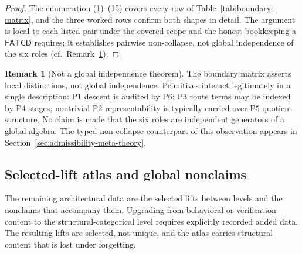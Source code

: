 \documentclass[11pt]{article}
\theoremstyle{definition}
\newtheorem{remark}[theorem]{Remark}
\newcommand{\FATCD}{\ensuremath{\mathsf{FATCD}}}
\newcommand{\Pone}{\ensuremath{\mathrm{P1}}}
\newcommand{\Ptwo}{\ensuremath{\mathrm{P2}}}
\newcommand{\Pthree}{\ensuremath{\mathrm{P3}}}
\newcommand{\Pfour}{\ensuremath{\mathrm{P4}}}
\newcommand{\Pfive}{\ensuremath{\mathrm{P5}}}
\newcommand{\Psix}{\ensuremath{\mathrm{P6}}}
\begin{document}
\begin{proof}
The enumeration (1)--(15) covers every row of
Table~\ref{tab:boundary-matrix}, and the three worked rows confirm both shapes
in detail. The argument is local to each listed pair under the covered scope and
the honest bookkeeping a \FATCD{} requires; it establishes pairwise
non-collapse, not global independence of the six roles (cf.\
Remark~\ref{rem:not-global-independence}).
\end{proof}

\begin{remark}[Not a global independence theorem]\label{rem:not-global-independence}
The boundary matrix asserts local distinctions, not global
independence. Primitives interact legitimately in a single
description: \Pone{} descent is audited by \Psix{}; \Pthree{} route
terms may be indexed by \Pfour{} stages; nontrivial \Ptwo{}
representability is typically carried over \Pfive{} quotient structure.
No claim is made that the six roles are independent generators of a
global algebra. The typed-non-collapse counterpart of this observation
appears in Section~\ref{sec:admissibility-meta-theory}.
\end{remark}

\subsection{Selected-lift atlas and global nonclaims}\label{subsec:lift-atlas}

The remaining architectural data are the selected lifts between levels
and the nonclaims that accompany them. Upgrading from behavioral or
verification content to the structural-categorical level requires
explicitly recorded added data. The resulting lifts are selected, not
unique, and the atlas carries structural content that is lost under
forgetting.
\end{document}
